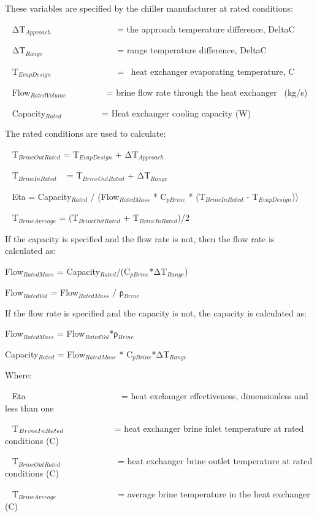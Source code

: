 These variables are specified by the chiller manufacturer at rated conditions:

~ ΔT\(_{Approach}\) ~~~~~~~~~~~~~~ = the approach temperature difference, DeltaC

~ ΔT\(_{Range}\) ~~~~~~~~~~~~~~~~ = range temperature difference, DeltaC

~ T\(_{EvapDesign}\) ~~~~~~~~~~~~~~ = ~heat exchanger evaporating temperature, C

~ Flow\(_{RatedVolume}\) ~~~~~~~~ = brine flow rate through the heat exchanger~ (kg/s)

~ Capacity\(_{Rated}\) ~~~~~~~~ = Heat exchanger cooling capacity (W)

The rated conditions are used to calculate:

~ T\(_{BrineOutRated}\) = T\(_{EvapDesign}\) + ΔT\(_{Approach}\)

~ T\(_{BrineInRated}\) ~ = T\(_{BrineOutRated}\) + ΔT\(_{Range}\)

~ Eta = Capacity\(_{Rated}\) / (Flow\(_{RatedMass}\) * C\(_{pBrine}\) * (T\(_{BrineInRated}\) - T\(_{EvapDesign}\)))

~ T\(_{BrineAverage}\) = (T\(_{BrineOutRated}\) + T\(_{BrineInRated}\))/2

If the capacity is specified and the flow rate is not, then the flow rate is calculated as:

Flow\(_{RatedMass}\) = Capacity\(_{Rated}\)/(C\(_{pBrine}\)*ΔT\(_{Range}\))

Flow\(_{RatedVol}\) = Flow\(_{RatedMass}\) / ρ\(_{Brine}\)

If the flow rate is specified and the capacity is not, the capacity is calculated as:

Flow\(_{RatedMass}\) = Flow\(_{RatedVol}\)*ρ\(_{Brine}\)

Capacity\(_{Rated}\) = Flow\(_{RatedMass}\) * C\(_{pBrine}\)*ΔT\(_{Range}\)

Where:

~ Eta~~ ~~~~~~~~~~~~~~~~~~~ = heat exchanger effectiveness, dimensionless and less than one

~ T\(_{BrineInRated\\}\)~~~~~~~~~~~ = heat exchanger brine inlet temperature at rated conditions (C)

~ T\(_{BrineOutRated}\) ~~~~~~~~~~~~ = heat exchanger brine outlet temperature at rated conditions (C)

~ T\(_{BrineAverage}\)~~~ ~~~~~~~~~~ = average brine temperature in the heat exchanger (C)

